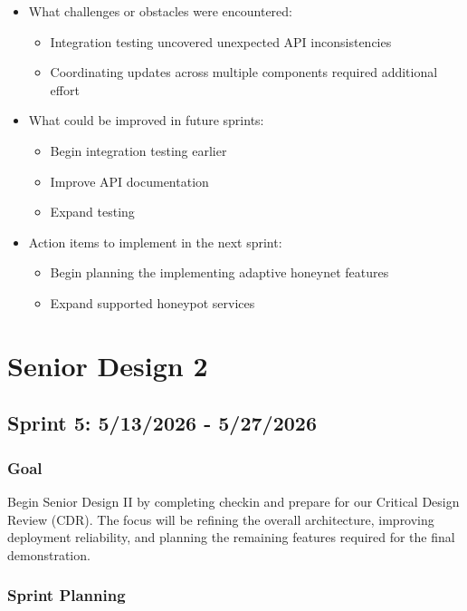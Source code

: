 \documentclass{article}
\begin{document}
\begin{itemize}
    \item What challenges or obstacles were encountered:
    
    \begin{itemize}
    \item Integration testing uncovered unexpected API inconsistencies
    \item Coordinating updates across multiple components required additional effort
    \end{itemize}
    
    \item What could be improved in future sprints:
    \begin{itemize}
    \item Begin integration testing earlier
    \item Improve API documentation
    \item Expand testing
    \end{itemize}
    \item Action items to implement in the next sprint:
    \begin{itemize}
    \item Begin planning the implementing adaptive honeynet features
    \item Expand supported honeypot services
    \end{itemize}
\end{itemize}

\section{Senior Design 2}
\subsection{Sprint 5: 5/13/2026 - 5/27/2026}
\subsubsection{Goal}
Begin Senior Design II by completing checkin and prepare for our Critical Design Review (CDR). The focus will be refining the overall architecture, improving deployment reliability, and planning the remaining features required for the final demonstration.

\subsubsection{Sprint Planning}
\end{document}
